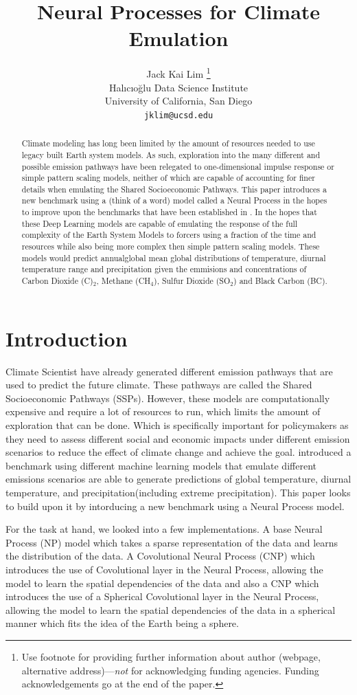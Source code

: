 \documentclass{article} %
\title{Neural Processes for Climate Emulation}
\author{Jack Kai Lim 
\thanks{ Use footnote for providing further information
about author (webpage, alternative address)---\emph{not} for acknowledging
funding agencies.  Funding acknowledgements go at the end of the paper.} \\
Halıcıoğlu Data Science Institute\\
University of California, San Diego\\
\texttt{jklim@ucsd.edu} \\
}
\begin{document}
\maketitle

\begin{abstract}
   {Climate modeling has long been limited by the amount of resources needed to use legacy built Earth system models. As such, exploration into the many different and possible emission pathways have been relegated to one-dimensional impulse response or simple pattern scaling models, neither of which are capable of accounting for finer details when emulating the Shared Socioeconomic Pathways. This paper introduces a new benchmark using a (think of a word) model called a Neural Process in the hopes to improve upon the benchmarks that have been established in \cite{watson2022climatebench}. In the hopes that these Deep Learning models are capable of emulating the response of the full complexity of the Earth System Models to forcers using a fraction of the time and resources while also being more complex then simple pattern scaling models. These models would predict annualglobal mean global distributions of temperature, diurnal temperature range and precipitation given the emmisions and concentrations of Carbon Dioxide (C)$_2$, Methane (CH$_4$), Sulfur Dioxide (SO$_2$) and Black Carbon (BC).
    }
\end{abstract}

\section{Introduction}
Climate Scientist have already generated different emission pathways that are used to predict the future climate. These pathways are called the Shared Socioeconomic Pathways (SSPs). However, these models are computationally expensive and require a lot of resources to run, which limits the amount of exploration that can be done. Which is specifically important for policymakers as they need to assess different social and economic impacts under different emission scenarios to reduce the effect of climate change and achieve the goal. \cite{watson2022climatebench} introduced a benchmark using different machine learning models that emulate different emissions scenarios are able to generate predictions of global temperature, diurnal temperature, and precipitation(including extreme precipitation). This paper looks to build upon it by intorducing a new benchmark using a Neural Process model.

For the task at hand, we looked into a few implementations. A base Neural Process (NP) model \cite{gordon2020convolutional} which takes a sparse representation of the data and learns the distribution of the data. A Covolutional Neural Process (CNP) which introduces the use of Covolutional layer in the Neural Process, allowing the model to learn the spatial dependencies of the data and also a CNP which introduces the use of a Spherical Covolutional layer in the Neural Process, allowing the model to learn the spatial dependencies of the data in a spherical manner which fits the idea of the Earth being a sphere.
\end{document}
